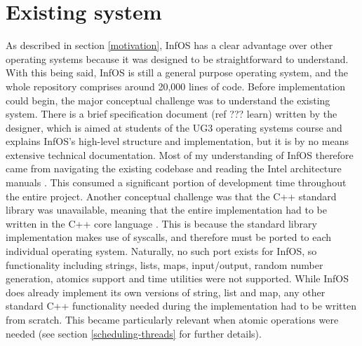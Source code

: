 \documentclass[bsc,frontabs,singlespacing,parskip,deptreport]{infthesis}     %
\begin{document}
\section{Existing system} \label{existing-system}
As described in section \ref{motivation}, InfOS has a clear advantage over other operating systems because it was designed to be straightforward to understand. With this being said, InfOS is still a general purpose operating system, and the whole repository comprises around 20,000 lines of code. Before implementation could begin, the major conceptual challenge was to understand the existing system. There is a brief specification document (ref ??? learn) written by the designer, which is aimed at students of the UG3 operating systems course and explains InfOS’s high-level structure and implementation, but it is by no means extensive technical documentation. Most of my understanding of InfOS therefore came from navigating the existing codebase and reading the Intel architecture manuals \cite{intel-full-manual}. This consumed a significant portion of development time throughout the entire project. Another conceptual challenge was that the C++ standard library was unavailable, meaning that the entire implementation had to be written in the C++ core language \cite{cpp-core}. This is because the standard library implementation makes use of syscalls, and therefore must be ported to each individual operating system. Naturally, no such port exists for InfOS, so functionality including strings, lists, maps, input/output, random number generation, atomics support and time utilities were not supported. While InfOS does already implement its own versions of string, list and map, any other standard C++ functionality needed during the implementation had to be written from scratch. This became particularly relevant when atomic operations were needed (see section \ref{scheduling-threads} for further details).
 
\end{document}
